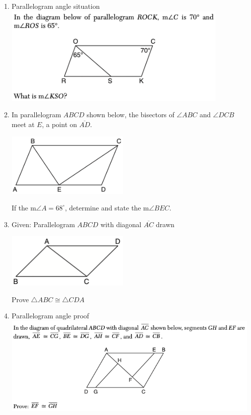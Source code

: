 \documentclass[12pt, oneside]{article}
\begin{document}
\begin{enumerate}
\item Parallelogram angle situation\\
\includegraphics[width=11cm]{R-5images/R-5QuadrilateralsJ.png}
\vspace{1cm}

\item In parallelogram $ABCD$ shown below, the bisectors of $\angle ABC$ and $\angle DCB$ meet at $E$, a point on $\overline{AD}$.
\begin{center}
    \includegraphics[width=6cm]{R-5images/R-5QuadrilateralsF.png}
\end{center}
If the m$\angle A=68^\circ$, determine and state the m$\angle BEC$.

\newpage
\item Given: Parallelogram $ABCD$ with diagonal $\overline{AC}$ drawn
\begin{center}
    \includegraphics[width=6cm]{R-5images/R-5QuadrilateralsH.png}
\end{center}
Prove $\triangle ABC \cong \triangle CDA$
\vspace{3cm}

\item Parallelogram angle proof\\
\includegraphics[width=16cm]{R-5images/R-5QuadrilateralsE.png}

\end{enumerate}
\end{document}
